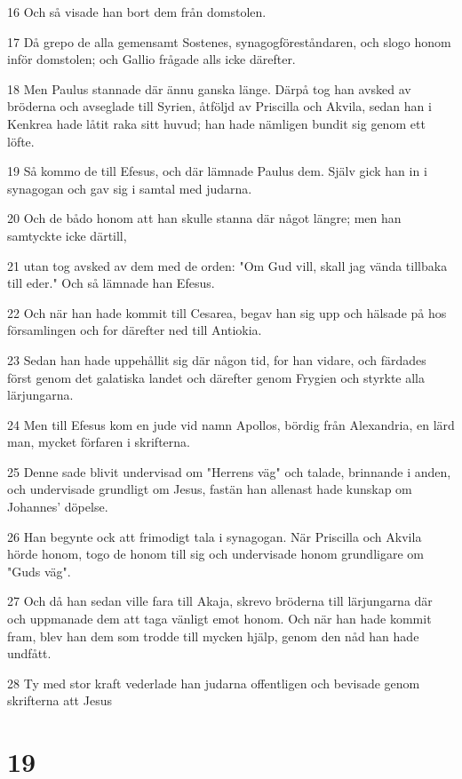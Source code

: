 \par 16 Och så visade han bort dem från domstolen.
\par 17 Då grepo de alla gemensamt Sostenes, synagogföreståndaren, och slogo honom inför domstolen; och Gallio frågade alls icke därefter.
\par 18 Men Paulus stannade där ännu ganska länge. Därpå tog han avsked av bröderna och avseglade till Syrien, åtföljd av Priscilla och Akvila, sedan han i Kenkrea hade låtit raka sitt huvud; han hade nämligen bundit sig genom ett löfte.
\par 19 Så kommo de till Efesus, och där lämnade Paulus dem. Själv gick han in i synagogan och gav sig i samtal med judarna.
\par 20 Och de bådo honom att han skulle stanna där något längre; men han samtyckte icke därtill,
\par 21 utan tog avsked av dem med de orden: "Om Gud vill, skall jag vända tillbaka till eder." Och så lämnade han Efesus.
\par 22 Och när han hade kommit till Cesarea, begav han sig upp och hälsade på hos församlingen och for därefter ned till Antiokia.
\par 23 Sedan han hade uppehållit sig där någon tid, for han vidare, och färdades först genom det galatiska landet och därefter genom Frygien och styrkte alla lärjungarna.
\par 24 Men till Efesus kom en jude vid namn Apollos, bördig från Alexandria, en lärd man, mycket förfaren i skrifterna.
\par 25 Denne sade blivit undervisad om "Herrens väg" och talade, brinnande i anden, och undervisade grundligt om Jesus, fastän han allenast hade kunskap om Johannes' döpelse.
\par 26 Han begynte ock att frimodigt tala i synagogan. När Priscilla och Akvila hörde honom, togo de honom till sig och undervisade honom grundligare om "Guds väg".
\par 27 Och då han sedan ville fara till Akaja, skrevo bröderna till lärjungarna där och uppmanade dem att taga vänligt emot honom. Och när han hade kommit fram, blev han dem som trodde till mycken hjälp, genom den nåd han hade undfått.
\par 28 Ty med stor kraft vederlade han judarna offentligen och bevisade genom skrifterna att Jesus

\chapter{19}


